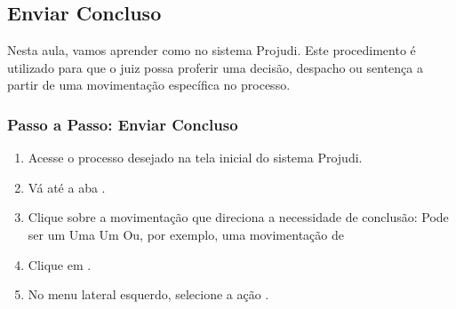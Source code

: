 \documentclass[letterpaper,10pt,brazil]{sphinxmanual}
\begin{document}
\sphinxstepscope


\subsection{Enviar Concluso}
\label{\detokenize{projud_35_enviarconcluso:enviar-concluso}}\label{\detokenize{projud_35_enviarconcluso::doc}}
\sphinxAtStartPar
Nesta aula, vamos aprender como  no sistema Projudi. Este procedimento é utilizado para que o juiz possa proferir uma decisão, despacho ou sentença a partir de uma movimentação específica no processo.


\subsubsection{Passo a Passo: Enviar Concluso}
\label{\detokenize{projud_35_enviarconcluso:passo-a-passo-enviar-concluso}}\begin{enumerate}
%
\item {} 
\sphinxAtStartPar
Acesse o processo desejado na tela inicial do sistema Projudi.

\item {} 
\sphinxAtStartPar
Vá até a aba .

\item {} 
\sphinxAtStartPar
Clique sobre a movimentação que direciona a necessidade de conclusão:
\sphinxhyphen{} Pode ser um 
\sphinxhyphen{} Uma 
\sphinxhyphen{} Um 
\sphinxhyphen{} Ou, por exemplo, uma movimentação de 

\item {} 
\sphinxAtStartPar
Clique em .

\item {} 
\sphinxAtStartPar
No menu lateral esquerdo, selecione a ação .

\end{enumerate}
\end{document}
